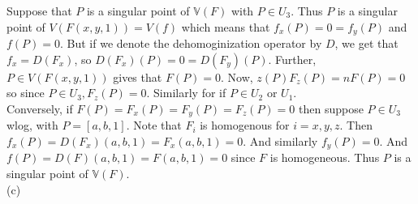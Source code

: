\documentclass[a4paper]{article}
\begin{document}
Suppose that $P$ is a singular point of $\mathbb{V}(F)$ with
$P \in U_3$. Thus $P$ is a singular point of $V(F(x,y,1)) = V(f)$ which means
that $f_x (P) = 0 = f_y(P)$ and $f(P) = 0$. But if we denote the dehomoginization operator by
$D$, we get that $f_x = D\left( F_x \right) $, so
$D\left( F_x \right) (P) = 0 = D(F_y)(P)$. Further, $P \in V
(F(x,y,1))$ gives that $F(P) = 0$. Now,
$z(P) F_z(P) = n F(P) = 0$ so since $P \in U_3, F_z(P)=0$. Similarly for if
$P \in U_2$ or $U_1$.\\
Conversely, if $F(P) = F_x(P) = F_y(P) = F_z(P) = 0$ then suppose $P \in U_3$
wlog, with $P = \left[ a, b, 1 \right] $. Note that
$F_i$ is homogenous for $i = x,y,z$. Then $f_x (P) = D(F_x)(a,b,1)  
= F_x(a,b,1) = 0 $. And similarly $f_y (P) = 0$. And
$f(P) = D(F)(a,b,1) = F(a,b,1) = 0$ since $F$ is homogeneous.
Thus
$P$ is a singular point of $\mathbb{V}(F)$.\\
\linebreak
(c) 



















\newpage
\end{document}
